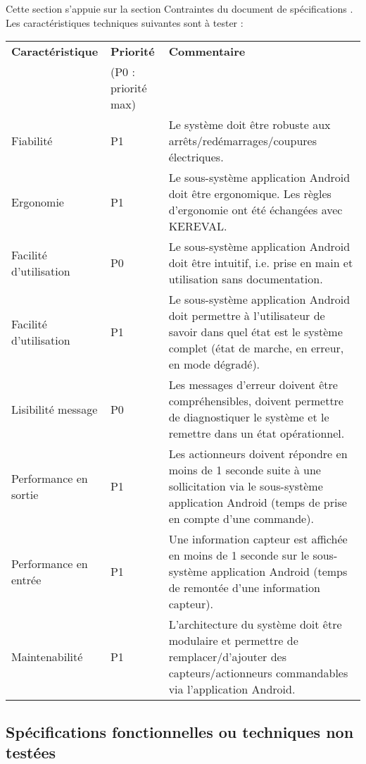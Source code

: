 Cette section s'appuie sur la section  Contraintes \fg du document de spécifications {}.\\
Les caractéristiques techniques suivantes sont à tester :
\noindent\begin{longtable}[c]{|p{}|p{}|p{}|}
\hline
\bf Caractéristique & \bf \centering Priorité & \bf Commentaire\\
[-1ex] & (P0 : priorité max) & \\
\hline
\endhead
Fiabilité & \centering P1 & Le système doit être robuste aux arrêts/redémarrages/coupures électriques.\\
\hline
Ergonomie & \centering P1 & Le sous-système application Android doit être ergonomique. Les règles d'ergonomie ont été échangées avec KEREVAL.\\
\hline
Facilité d'utilisation & \centering P0 & Le sous-système application Android doit être intuitif, i.e. prise en main et utilisation sans documentation.\\
\hline
Facilité d'utilisation & \centering P1 & Le sous-système application Android doit permettre à l'utilisateur de savoir dans quel état est le système complet (état de marche, en erreur, en mode dégradé).\\
\hline
Lisibilité message & \centering P0 & Les messages d'erreur doivent être compréhensibles, doivent permettre de diagnostiquer le système et le remettre dans un état opérationnel.\\
\hline
Performance en sortie & \centering P1 & Les actionneurs doivent répondre en moins de 1 seconde suite à une sollicitation via le sous-système application Android (temps de prise en compte d'une commande).\\
\hline
Performance en entrée & \centering P1 & Une information capteur est affichée en moins de 1 seconde sur le sous-système application Android (temps de remontée d'une information capteur).\\
\hline
Maintenabilité & \centering P1 & L'architecture du système doit être modulaire et permettre de remplacer/d'ajouter des capteurs/actionneurs commandables via l'application Android.\\
\hline
\end{longtable}

\subsection{Spécifications fonctionnelles ou techniques non testées}
\label{sec:peri:nontest}


